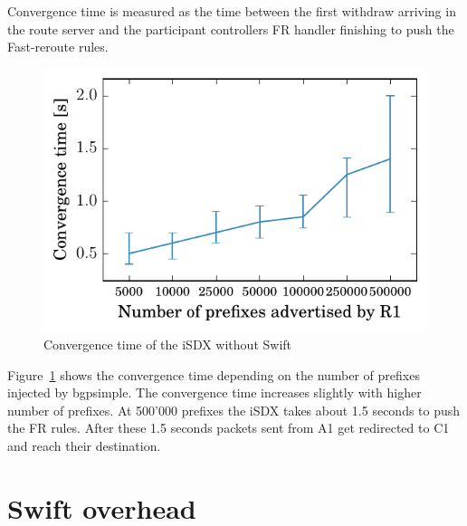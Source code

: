 Convergence time is measured as the time between the first withdraw arriving in the route server and the participant controllers FR handler finishing to push the Fast-reroute rules. \\

\begin{figure}[h]
\center
\includegraphics[scale = 1]{Figures/swift.pdf}
\caption{Convergence time of the iSDX without Swift}
\label{fig:withswift}
\end{figure}

Figure~\ref{fig:withswift} shows the convergence time depending on the number of prefixes injected by bgpsimple.
The convergence time increases slightly with higher number of prefixes. At 500'000 prefixes the iSDX takes about 1.5 seconds to push the FR rules. After these 1.5 seconds packets sent from A1 get redirected to C1 and reach their destination. \\

\section{\label{chapter4:Swift overhead}Swift overhead}

\newpage